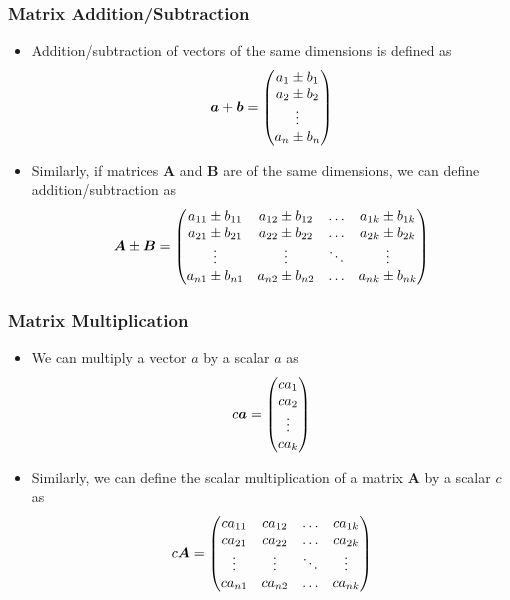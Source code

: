 \documentclass[pdflatex, 12pt]{beamer}
\begin{document}
\begin{frame}
\frametitle{Matrix Addition/Subtraction}
\begin{itemize}
\item Addition/subtraction of vectors of the same dimensions is defined as
 \begin{equation}
 \bm{a} + \bm{b} = \begin{pmatrix}
 a_1 \pm b_1 \\
 a_2 \pm b_2 \\
 \vdots \\
 a_n \pm b_n \\
 \end{pmatrix} \notag
 \end{equation}
\item Similarly, if matrices $\bm{A}$ and $\bm{B}$ are of the same dimensions, we can define addition/subtraction as 
 \begin{equation}
 \bm{A} \pm \bm{B} = \begin{pmatrix}
 a_{11} \pm b_{11} & a_{12} \pm b_{12} & \ldots & a_{1k} \pm b_{1k} \\
 a_{21} \pm b_{21} & a_{22} \pm b_{22} & \ldots & a_{2k} \pm b_{2k} \\
 \vdots & \vdots & \ddots & \vdots \\
 a_{n1} \pm b_{n1} & a_{n2} \pm b_{n2} & \ldots & a_{nk} \pm b_{nk} \\
 \end{pmatrix} \notag
 \end{equation}
\end{itemize}
\end{frame}

\begin{frame}
\frametitle{Matrix Multiplication}
\begin{itemize}
\item We can multiply a vector $a$ by a scalar $a$ as 
 \begin{equation}
 c\bm{a} = \begin{pmatrix}
 ca_1 \\
 ca_2 \\
 \vdots \\
 ca_k
 \end{pmatrix} \notag
 \end{equation}
\item Similarly, we can define the scalar multiplication of a matrix $\bm{A}$ by a scalar $c$ as
 \begin{equation}
 c\bm{A} = \begin{pmatrix}
 ca_{11} & ca_{12} & \ldots & ca_{1k} \\
 ca_{21} & ca_{22} & \ldots & ca_{2k} \\
 \vdots & \vdots & \ddots & \vdots \\
 ca_{n1} & ca_{n2} & \ldots & ca_{nk} \\
 \end{pmatrix} \notag
 \end{equation}
\end{itemize}
\end{frame}
\end{document}
